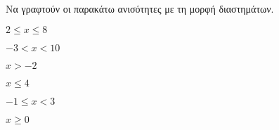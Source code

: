 Να γραφτούν οι παρακάτω ανισότητες με τη μορφή διαστημάτων.
\begin{multicols}{2}
\begin{alist}
\item $ 2\leq x\leq 8 $
\item $ -3<x<10 $
\item $ x>-2 $
\item $ x\leq 4 $
\item $ -1\leq x<3 $
\item $ x\geq 0 $
\end{alist}
\end{multicols}
